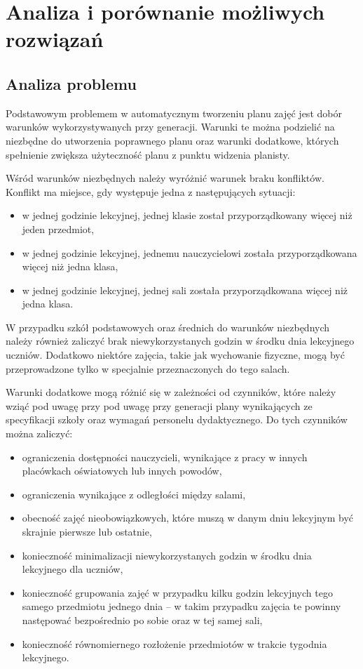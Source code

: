 \chapter{Analiza i porównanie możliwych rozwiązań}
\section{Analiza problemu}
Podstawowym problemem w automatycznym tworzeniu planu zajęć jest dobór warunków wykorzystywanych przy generacji. Warunki te można podzielić na niezbędne do utworzenia poprawnego planu oraz warunki dodatkowe, których spełnienie zwiększa użyteczność planu z punktu widzenia planisty. 

Wśród warunków niezbędnych należy wyróżnić warunek braku konfliktów. Konflikt ma miejsce, gdy występuje jedna z następujących sytuacji:
\begin{itemize}
    \item w jednej godzinie lekcyjnej, jednej klasie został przyporządkowany więcej niż jeden przedmiot,
    \item w jednej godzinie lekcyjnej, jednemu nauczycielowi została przyporządkowana więcej niż jedna klasa,
    \item w jednej godzinie lekcyjnej, jednej sali została przyporządkowana więcej niż jedna klasa.
\end{itemize}
W przypadku szkół podstawowych oraz średnich do warunków niezbędnych należy również zaliczyć brak niewykorzystanych godzin w środku dnia lekcyjnego uczniów. Dodatkowo niektóre zajęcia, takie jak wychowanie fizyczne, mogą być przeprowadzone tylko w specjalnie przeznaczonych do tego salach.

Warunki dodatkowe mogą różnić się w zależności od czynników, które należy wziąć pod uwagę przy pod uwagę przy generacji plany wynikających ze specyfikacji szkoły oraz wymagań personelu dydaktycznego. Do tych czynników można zaliczyć:
\begin{itemize}
    \item ograniczenia dostępności nauczycieli, wynikające z pracy w innych placówkach oświatowych lub innych powodów,
    \item ograniczenia wynikające z odległości między salami,
    \item obecność zajęć nieobowiązkowych, które muszą w danym dniu lekcyjnym być skrajnie pierwsze lub ostatnie,
    \item  konieczność minimalizacji niewykorzystanych godzin w środku dnia lekcyjnego dla uczniów,
    \item konieczność grupowania zajęć w przypadku kilku godzin lekcyjnych tego samego przedmiotu jednego dnia -- w takim przypadku zajęcia te powinny następować bezpośrednio po sobie oraz w tej samej sali,
    \item konieczność równomiernego rozłożenie przedmiotów w trakcie tygodnia lekcyjnego.
\end{itemize}
